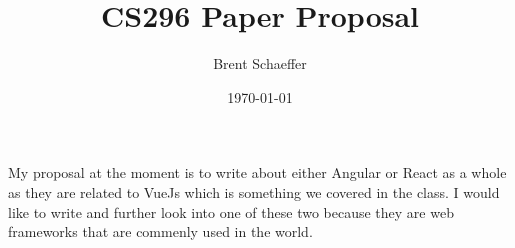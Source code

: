 \documentclass{article}
\title{CS296 Paper Proposal}
\author{Brent Schaeffer}
\date{\today}
\begin{document}
\maketitle

My proposal at the moment is to write about either Angular or React as a whole as they are 
related to VueJs which is something we covered in the class. I would like to write and further 
look into one of these two because they are web frameworks that are commenly used in the world.

    
\end{document}
